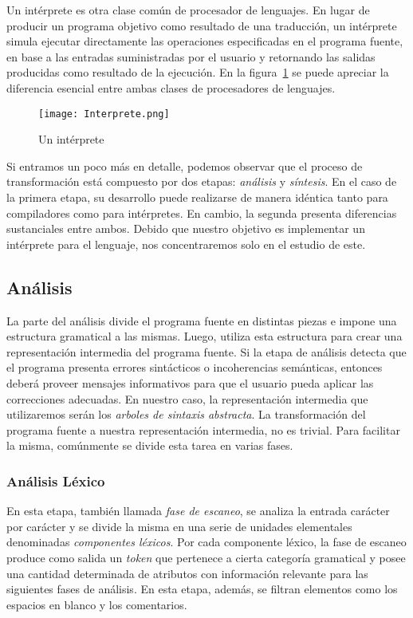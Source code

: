 Un intérprete es otra clase común de procesador de lenguajes.
En lugar de producir un programa objetivo como resultado de una traducción, un intérprete simula ejecutar directamente las operaciones especificadas en el programa fuente, en base a las entradas suministradas por el usuario y retornando las salidas producidas como resultado de la ejecución.
En la figura~\ref{Intérprete} se puede apreciar la diferencia esencial entre ambas clases de procesadores de lenguajes.

\begin{figure}[h]
\centering
\texttt{[image: Interprete.png]}
\caption{Un intérprete}
\label{Intérprete}
\end{figure}

Si entramos un poco más en detalle, podemos observar que el proceso de transformación está compuesto por dos etapas: \textit{análisis} y \textit{síntesis}.
En el caso de la primera etapa, su desarrollo puede realizarse de manera idéntica tanto para compiladores como para intérpretes.
En cambio, la segunda presenta diferencias sustanciales entre ambos.
Debido que nuestro objetivo es implementar un intérprete para el lenguaje, nos concentraremos solo en el estudio de este.

\subsection{Análisis}

La parte del análisis divide el programa fuente en distintas piezas e impone una estructura gramatical a las mismas.
Luego, utiliza esta estructura para crear una representación intermedia del programa fuente.
Si la etapa de análisis detecta que el programa presenta errores sintácticos o incoherencias semánticas, entonces deberá proveer mensajes informativos para que el usuario pueda aplicar las correcciones adecuadas.
En nuestro caso, la representación intermedia que utilizaremos serán los \textit{arboles de sintaxis abstracta}.
La transformación del programa fuente a nuestra representación intermedia, no es trivial.
Para facilitar la misma, comúnmente se divide esta tarea en varias fases.

\subsubsection{Análisis Léxico}

En esta etapa, también llamada \textit{fase de escaneo}, se analiza la entrada carácter por carácter y se divide la misma en una serie de unidades elementales denominadas \textit{componentes léxicos}.
Por cada componente léxico, la fase de escaneo produce como salida un \textit{token} que pertenece a cierta categoría gramatical y posee una cantidad determinada de atributos con información relevante para las siguientes fases de análisis.
En esta etapa, además, se filtran elementos como los espacios en blanco y los comentarios.

